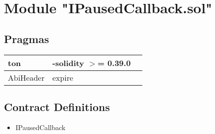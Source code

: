 
\section{Module "IPausedCallback.sol"}


\subsection{Pragmas}


\noindent\begin{tabular}{|l|l|p{5cm}|}\hline
ton & -solidity $>$= 0.39.0 &\\\hline
AbiHeader &  expire &\\\hline
\end{tabular}


\subsection{Contract Definitions}

\begin{itemize}
\item IPausedCallback
\end{itemize}
